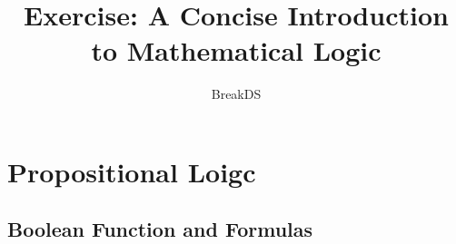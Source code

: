 \documentclass[a4paper, 12pt]{article}
\title{Exercise: A Concise Introduction to Mathematical Logic}
\author{BreakDS}
\date{}
\begin{document}
\maketitle

\section{Propositional Loigc}
\subsection{Boolean Function and Formulas}
\subsection{}
\subsection{}
\end{document}
